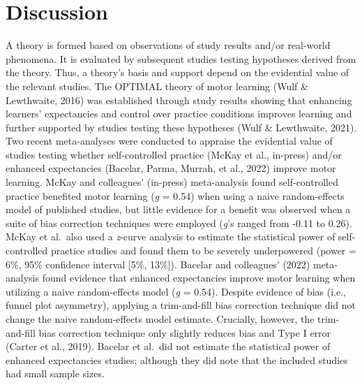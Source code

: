 \documentclass[
  man, donotrepeattitle,floatsintext]{apa7}
\begin{document}
\clearpage

\normalsize

\hypertarget{discussion}{%
\section{Discussion}\label{discussion}}

A theory is formed based on observations of study results and/or real-world phenomena. It is evaluated by subsequent studies testing hypotheses derived from the theory. Thus, a theory's basis and support depend on the evidential value of the relevant studies. The OPTIMAL theory of motor learning (Wulf \& Lewthwaite, 2016) was established through study results showing that enhancing learners' expectancies and control over practice conditions improves learning and further supported by studies testing these hypotheses (Wulf \& Lewthwaite, 2021). Two recent meta-analyses were conducted to appraise the evidential value of studies testing whether self-controlled practice (McKay et al., in-press) and/or enhanced expectancies (Bacelar, Parma, Murrah, et al., 2022) improve motor learning. McKay and colleagues' (in-press) meta-analysis found self-controlled practice benefited motor learning (\emph{g} = 0.54) when using a naive random-effects model of published studies, but little evidence for a benefit was observed when a suite of bias correction techniques were employed (\emph{g}'s ranged from -0.11 to 0.26). McKay et al.~also used a \emph{z}-curve analysis to estimate the statistical power of self-controlled practice studies and found them to be severely underpowered (power = 6\%, 95\% confidence interval {[}5\%, 13\%{]}). Bacelar and colleagues' (2022) meta-analysis found evidence that enhanced expectancies improve motor learning when utilizing a naive random-effects model (\emph{g} = 0.54). Despite evidence of bias (i.e., funnel plot asymmetry), applying a trim-and-fill bias correction technique did not change the naive random-effects model estimate. Crucially, however, the trim-and-fill bias correction technique only slightly reduces bias and Type I error (Carter et al., 2019). Bacelar et al.~did not estimate the statistical power of enhanced expectancies studies; although they did note that the included studies had small sample sizes.
\end{document}
